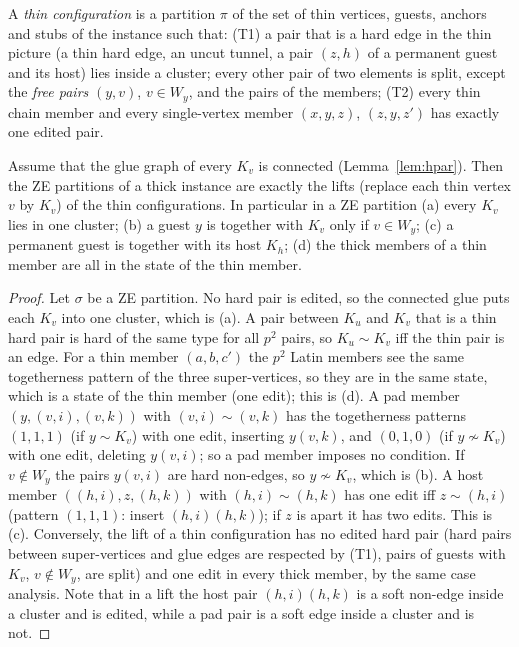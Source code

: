  A \emph{thin configuration} is a partition $\pi$ of the set of thin vertices, guests, anchors and stubs of the instance such that: (T1) a pair that is a hard edge in the thin picture (a thin hard edge, an uncut tunnel, a pair $(z,h)$ of a permanent guest and its host) lies inside a cluster; every other pair of two elements is split, except the \emph{free pairs} $(y,v)$, $v\in W_y$, and the pairs of the members; (T2) every thin chain member and every single-vertex member $(x,y,z)$, $(z,y,z')$ has exactly one edited pair.

\begin{lemma}[Blow-up]\label{lem:hblow}
Assume that the glue graph of every $K_v$ is connected (Lemma~\ref{lem:hpar}). Then the ZE partitions of a thick instance are exactly the lifts (replace each thin vertex $v$ by $K_v$) of the thin configurations. In particular in a ZE partition (a) every $K_v$ lies in one cluster; (b) a guest $y$ is together with $K_v$ only if $v\in W_y$; (c) a permanent guest is together with its host $K_h$; (d) the thick members of a thin member are all in the state of the thin member.
\end{lemma}
\begin{proof}
Let $\sigma$ be a ZE partition. No hard pair is edited, so the connected glue puts each $K_v$ into one cluster, which is (a). A pair between $K_u$ and $K_v$ that is a thin hard pair is hard of the same type for all $p^2$ pairs, so $K_u\sim K_v$ iff the thin pair is an edge. For a thin member $(a,b,c')$ the $p^2$ Latin members see the same togetherness pattern of the three super-vertices, so they are in the same state, which is a state of the thin member (one edit); this is (d). A pad member $(y,(v,i),(v,k))$ with $(v,i)\sim(v,k)$ has the togetherness patterns $(1,1,1)$ (if $y\sim K_v$) with one edit, inserting $y(v,k)$, and $(0,1,0)$ (if $y\not\sim K_v$) with one edit, deleting $y(v,i)$; so a pad member imposes no condition. If $v\notin W_y$ the pairs $y(v,i)$ are hard non-edges, so $y\not\sim K_v$, which is (b). A host member $((h,i),z,(h,k))$ with $(h,i)\sim(h,k)$ has one edit iff $z\sim(h,i)$ (pattern $(1,1,1)$: insert $(h,i)(h,k)$); if $z$ is apart it has two edits. This is (c). Conversely, the lift of a thin configuration has no edited hard pair (hard pairs between super-vertices and glue edges are respected by (T1), pairs of guests with $K_v$, $v\notin W_y$, are split) and one edit in every thick member, by the same case analysis. Note that in a lift the host pair $(h,i)(h,k)$ is a soft non-edge inside a cluster and is edited, while a pad pair is a soft edge inside a cluster and is not.
\end{proof}

